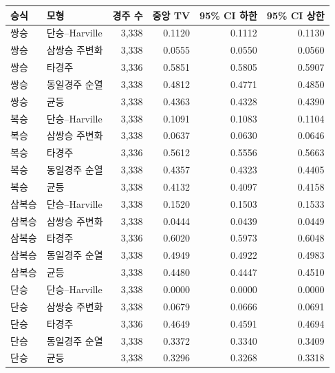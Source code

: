 \begin{tabular}{llrrrr}
\toprule
승식 & 모형 & 경주 수 & 중앙 TV & 95\% CI 하한 & 95\% CI 상한 \\
\midrule
쌍승 & 단승--Harville & 3,338 & 0.1120 & 0.1112 & 0.1130 \\
쌍승 & 삼쌍승 주변화 & 3,338 & 0.0555 & 0.0550 & 0.0560 \\
쌍승 & 타경주 & 3,336 & 0.5851 & 0.5805 & 0.5907 \\
쌍승 & 동일경주 순열 & 3,338 & 0.4812 & 0.4771 & 0.4850 \\
쌍승 & 균등 & 3,338 & 0.4363 & 0.4328 & 0.4390 \\
복승 & 단승--Harville & 3,338 & 0.1091 & 0.1083 & 0.1104 \\
복승 & 삼쌍승 주변화 & 3,338 & 0.0637 & 0.0630 & 0.0646 \\
복승 & 타경주 & 3,336 & 0.5612 & 0.5556 & 0.5663 \\
복승 & 동일경주 순열 & 3,338 & 0.4357 & 0.4323 & 0.4405 \\
복승 & 균등 & 3,338 & 0.4132 & 0.4097 & 0.4158 \\
삼복승 & 단승--Harville & 3,338 & 0.1520 & 0.1503 & 0.1533 \\
삼복승 & 삼쌍승 주변화 & 3,338 & 0.0444 & 0.0439 & 0.0449 \\
삼복승 & 타경주 & 3,336 & 0.6020 & 0.5973 & 0.6048 \\
삼복승 & 동일경주 순열 & 3,338 & 0.4949 & 0.4922 & 0.4983 \\
삼복승 & 균등 & 3,338 & 0.4480 & 0.4447 & 0.4510 \\
단승 & 단승--Harville & 3,338 & 0.0000 & 0.0000 & 0.0000 \\
단승 & 삼쌍승 주변화 & 3,338 & 0.0679 & 0.0666 & 0.0691 \\
단승 & 타경주 & 3,336 & 0.4649 & 0.4591 & 0.4694 \\
단승 & 동일경주 순열 & 3,338 & 0.3372 & 0.3340 & 0.3409 \\
단승 & 균등 & 3,338 & 0.3296 & 0.3268 & 0.3318 \\
\bottomrule
\end{tabular}
